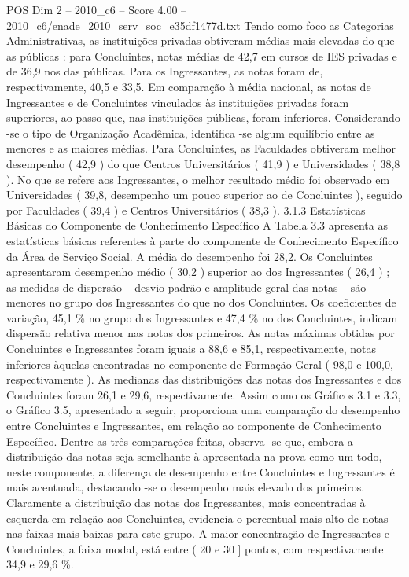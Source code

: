 \begin{textsample}{POS Dim 2 – 2010\_c6 – Score 4.00 – 2010\_c6/enade\_2010\_serv\_soc\_e35df1477d.txt}
Tendo como foco as Categorias Administrativas, as instituições privadas obtiveram médias mais elevadas do que as públicas : para Concluintes, notas médias de 42,7 em cursos de IES privadas e de 36,9 nos das públicas.
Para os Ingressantes, as notas foram de, respectivamente, 40,5 e 33,5.
Em comparação à média nacional, as notas de Ingressantes e de Concluintes vinculados às instituições privadas foram superiores, ao passo que, nas instituições públicas, foram inferiores.
Considerando -se o tipo de Organização Acadêmica, identifica -se algum equilíbrio entre as menores e as maiores médias.
Para Concluintes, as Faculdades obtiveram melhor desempenho ( 42,9 ) do que Centros Universitários ( 41,9 ) e Universidades ( 38,8 ).
No que se refere aos Ingressantes, o melhor resultado médio foi observado em Universidades ( 39,8, desempenho um pouco superior ao de Concluintes ), seguido por Faculdades ( 39,4 ) e Centros Universitários ( 38,3 ). 3.1.3 Estatísticas Básicas do Componente de Conhecimento Específico A Tabela 3.3 apresenta as estatísticas básicas referentes à parte do componente de Conhecimento Específico da Área de Serviço Social.
A média do desempenho foi 28,2.
Os Concluintes apresentaram desempenho médio ( 30,2 ) superior ao dos Ingressantes ( 26,4 ) ; as medidas de dispersão – desvio padrão e amplitude geral das notas – são menores no grupo dos Ingressantes do que no dos Concluintes.
Os coeficientes de variação, 45,1 \% no grupo dos Ingressantes e 47,4 \% no dos Concluintes, indicam dispersão relativa menor nas notas dos primeiros.
As notas máximas obtidas por Concluintes e Ingressantes foram iguais a 88,6 e 85,1, respectivamente, notas inferiores àquelas encontradas no componente de Formação Geral ( 98,0 e 100,0, respectivamente ).
As medianas das distribuições das notas dos Ingressantes e dos Concluintes foram 26,1 e 29,6, respectivamente.
Assim como os Gráficos 3.1 e 3.3, o Gráfico 3.5, apresentado a seguir, proporciona uma comparação do desempenho entre Concluintes e Ingressantes, em relação ao componente de Conhecimento Específico.
Dentre as três comparações feitas, observa -se que, embora a distribuição das notas seja semelhante à apresentada na prova como um todo, neste componente, a diferença de desempenho entre Concluintes e Ingressantes é mais acentuada, destacando -se o desempenho mais elevado dos primeiros.
Claramente a distribuição das notas dos Ingressantes, mais concentradas à esquerda em relação aos Concluintes, evidencia o percentual mais alto de notas nas faixas mais baixas para este grupo.
A maior concentração de Ingressantes e Concluintes, a faixa modal, está entre ( 20 e 30 ] pontos, com respectivamente 34,9 e 29,6 \%.

\end{textsample}
